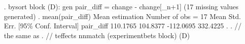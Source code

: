 . bysort block (D): gen pair_diff = change - change[_n+1]
(17 missing values generated)
{\smallskip}
. mean(pair_diff)
{\smallskip}
Mean estimation                   Number of obs   =         17
{\smallskip}
             {\VBAR}       Mean   Std. Err.     [95\% Conf. Interval]
   pair_diff {\VBAR}   110.1765   104.8377     -112.0695    332.4225
{\smallskip}
. 
. // the same as
. // teffects nnmatch (experimentbets block) (D)
